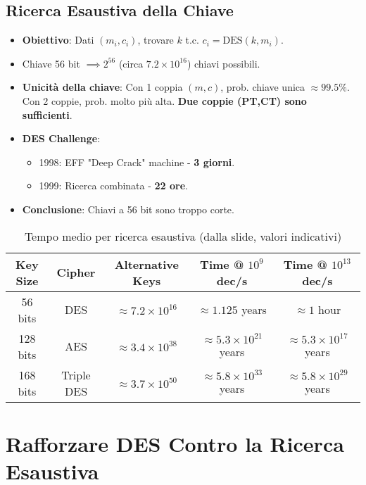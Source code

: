 \subsection{Ricerca Esaustiva della Chiave}
\begin{itemize}
    \item \textbf{Obiettivo}: Dati $(m_i, c_i)$, trovare $k$ t.c. $c_i = \text{DES}(k, m_i)$.
    \item Chiave 56 bit $\implies 2^{56}$ (circa $7.2 \times 10^{16}$) chiavi possibili.
    \item \textbf{Unicità della chiave}: Con 1 coppia $(m,c)$, prob. chiave unica $\approx 99.5\%$. Con 2 coppie, prob. molto più alta. \textbf{Due coppie (PT,CT) sono sufficienti}.
    \item \textbf{DES Challenge}:
    \begin{itemize}
        \item 1998: EFF "Deep Crack" machine - \textbf{3 giorni}.
        \item 1999: Ricerca combinata - \textbf{22 ore}.
    \end{itemize}
    \item \textbf{Conclusione}: Chiavi a 56 bit sono troppo corte.
\end{itemize}

\begin{table}[H]
\centering
\caption{Tempo medio per ricerca esaustiva (dalla slide, valori indicativi)}
\begin{tabular}{|c|c|c|c|c|}
\rowcolor{bg_custom}
\hline
\textbf{Key Size} & \textbf{Cipher} & \textbf{Alternative Keys} & \textbf{Time @ $10^9$ dec/s} & \textbf{Time @ $10^{13}$ dec/s} \\ \hline
56 bits  & DES        & $\approx 7.2 \times 10^{16}$ & $\approx 1.125$ years & $\approx 1$ hour \\
128 bits & AES        & $\approx 3.4 \times 10^{38}$ & $\approx 5.3 \times 10^{21}$ years & $\approx 5.3 \times 10^{17}$ years \\
168 bits & Triple DES & $\approx 3.7 \times 10^{50}$ & $\approx 5.8 \times 10^{33}$ years & $\approx 5.8 \times 10^{29}$ years \\
\hline
\end{tabular}
\end{table}


\section{Rafforzare DES Contro la Ricerca Esaustiva}

